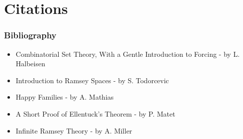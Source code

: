 \documentclass[handout]{beamer}
\begin{document}
\section{Citations}
\begin{frame}
\frametitle{Bibliography}
\begin{itemize}
    \item Combinatorial Set Theory, With a Gentle Introduction to Forcing - by L. Halbeisen
    \item Introduction to Ramsey Spaces - by S. Todorcevic
    \item Happy Families - by A. Mathias
    \item A Short Proof of Ellentuck's Theorem - by P. Matet
    \item Infinite Ramsey Theory - by A. Miller
\end{itemize}
\end{frame}
\end{document}
